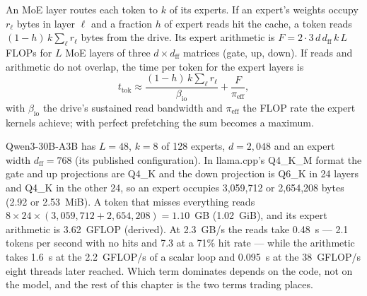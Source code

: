

An MoE layer routes each token to $k$ of its experts. If an expert's weights
occupy $r_\ell$ bytes in layer $\ell$ and a fraction $h$ of expert reads hit the
cache, a token reads $(1-h)\,k\sum_\ell r_\ell$ bytes from the drive. Its expert
arithmetic is $F = 2\cdot 3\,d\,d_{\mathrm{ff}}\,k\,L$ FLOPs for $L$ MoE layers
of three $d \times d_{\mathrm{ff}}$ matrices (gate, up, down). If reads and
arithmetic do not overlap, the time per token for the expert layers is
\begin{equation}
t_{\mathrm{tok}} \approx \frac{(1-h)\,k\sum_{\ell} r_\ell}{\beta_{\mathrm{io}}}
 + \frac{F}{\pi_{\mathrm{eff}}},
\label{eq:expert-stream-time}
\end{equation}
with $\beta_{\mathrm{io}}$ the drive's sustained read bandwidth and
$\pi_{\mathrm{eff}}$ the FLOP rate the expert kernels achieve; with perfect
prefetching the sum becomes a maximum.

Qwen3-30B-A3B has $L = 48$, $k = 8$ of 128 experts, $d = 2{,}048$ and an expert
width $d_{\mathrm{ff}} = 768$ (its published configuration). In llama.cpp's
Q4\_K\_M format the gate and up projections are Q4\_K and the down projection is
Q6\_K in 24 layers and Q4\_K in the other 24, so an expert occupies 3,059,712 or
2,654,208 bytes (2.92 or 2.53~MiB). A token that misses everything reads
$8 \times 24 \times (3{,}059{,}712 + 2{,}654{,}208) = 1.10$~GB (1.02~GiB), and
its expert arithmetic is 3.62~GFLOP (derived). At 2.3~GB/s the reads take
0.48~s --- 2.1 tokens per second with no hits and 7.3 at a 71\% hit rate ---
while the arithmetic takes 1.6~s at the 2.2~GFLOP/s of a scalar loop and
0.095~s at the 38~GFLOP/s eight threads later reached. Which term dominates
depends on the code, not on the model, and the rest of this chapter is the two
terms trading places.

